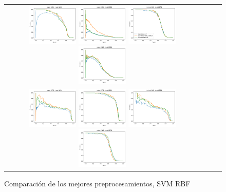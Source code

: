 \begin{figure}[h!]
\begin{tabular}{cccc}
  \includegraphics[width=0.25\textwidth]{Kap4/kFigure_13.png}  \includegraphics[width=0.25\textwidth]{Kap4/kFigure_14.png} 
  \includegraphics[width=0.25\textwidth]{Kap4/kFigure_15.png}  \includegraphics[width=0.25\textwidth]{Kap4/kFigure_16.png} \\
	  \includegraphics[width=0.25\textwidth]{Kap4/kFigure_17.png}  \includegraphics[width=0.25\textwidth]{Kap4/kFigure_18.png} 
		  \includegraphics[width=0.25\textwidth]{Kap4/kFigure_19.png}  \includegraphics[width=0.25\textwidth]{Kap4/kFigure_20.png}
\end{tabular}
\caption{Comparación de los mejores preprocesamientos, SVM RBF}
\label{fig:svmk_final_comparison}
\end{figure}


